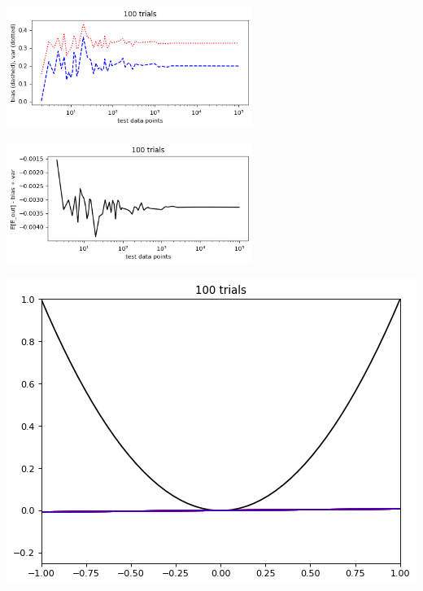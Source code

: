 \documentclass[12pt]{article}
\begin{document}
\pagebreak
{}
        \begin{center}\includegraphics[width=0.6\textwidth]{png/100_trials_bias-var.png}\end{center}
        \begin{center}\includegraphics[width=0.6\textwidth]{png/100_trials_diff.png}\end{center}
        \begin{center}\includegraphics[width=0.58\linewidth]{png/100_trials.png}\end{center}

\printbibliography[title={AML Book}]
\end{document}
